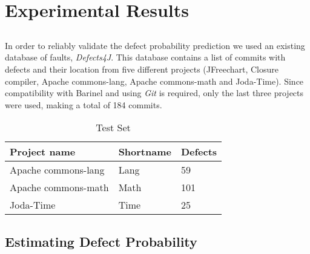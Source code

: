 \chapter{Experimental Results} \label{chap:exp-results}

\section*{}

In order to reliably validate the defect probability prediction we used an existing database of faults, \emph{Defects4J}.
This database contains a list of commits with defects and their location from five different projects (JFreechart, Closure compiler, Apache commons-lang, Apache commons-math and Joda-Time).
Since compatibility with Barinel and using \emph{Git} is required, only the last three projects were used, making a total of 184 commits.
%
\begin{table}[H]
	\centering
	\begin{tabular}{|l|l|l|}
	\hline
	\textbf{Project name} & \textbf{Shortname} & \textbf{Defects} \\ \hline
	Apache commons-lang   & Lang               & 59               \\ \hline
	Apache commons-math   & Math               & 101              \\ \hline
	Joda-Time             & Time               & 25               \\ \hline
	\end{tabular}
	\caption{Test Set}
	\label{test-set}
\end{table}

\section{Estimating Defect Probability}

